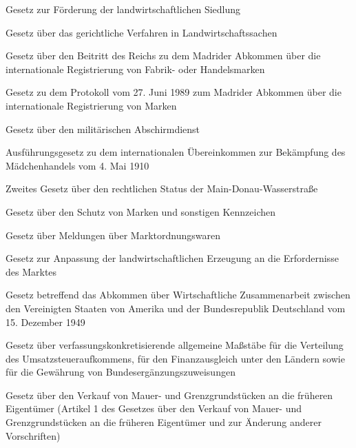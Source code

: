 \item[{LwSiedlFöG-1953}] Gesetz zur Förderung der landwirtschaftlichen Siedlung

\item[{LwVfG}] Gesetz über das gerichtliche Verfahren in Landwirtschaftssachen

\item[{MAbkMadridG}] Gesetz über den Beitritt des Reichs zu dem Madrider Abkommen über die internationale Registrierung von Fabrik- oder Handelsmarken

\item[{MAbkMadridProtG}] Gesetz zu dem Protokoll vom 27. Juni 1989 zum Madrider Abkommen über die internationale Registrierung von Marken

\item[{MADG}] Gesetz über den militärischen Abschirmdienst

\item[{MädchHdlÜbkAG}] Ausführungsgesetz zu dem internationalen Übereinkommen zur Bekämpfung des Mädchenhandels vom 4. Mai 1910

\item[{MainDonWasStrG-2}] Zweites Gesetz über den rechtlichen Status der Main-Donau-Wasserstraße

\item[{MarkenG}] Gesetz über den Schutz von Marken und sonstigen Kennzeichen

\item[{MarktONOG}] Gesetz über Meldungen über Marktordnungswaren

\item[{MarktStrG}] Gesetz zur Anpassung der landwirtschaftlichen Erzeugung an die Erfordernisse des Marktes

\item[{MarshallplAbkG}] Gesetz betreffend das Abkommen über Wirtschaftliche Zusammenarbeit zwischen den Vereinigten Staaten von Amerika und der Bundesrepublik Deutschland vom 15. Dezember 1949

\item[{MaßstG}] Gesetz über verfassungskonkretisierende allgemeine Maßstäbe für die Verteilung des Umsatzsteueraufkommens, für den Finanzausgleich unter den Ländern sowie für die Gewährung von Bundesergänzungszuweisungen

\item[{MauerG}] Gesetz über den Verkauf von Mauer- und Grenzgrundstücken an die früheren Eigentümer (Artikel 1 des Gesetzes über den Verkauf von Mauer- und Grenzgrundstücken an die früheren Eigentümer und zur Änderung anderer Vorschriften)


